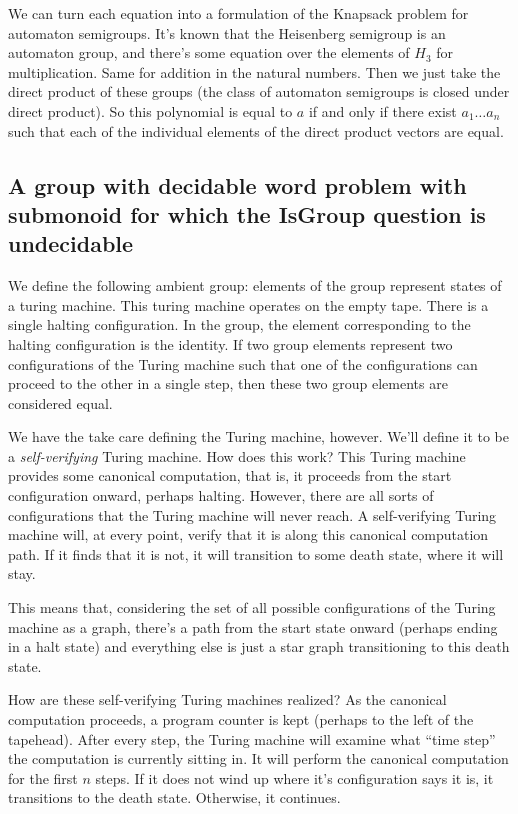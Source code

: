 \documentclass[10pt]{article}
\newcommand{\defn}[1]{\textit{#1}}
\begin{document}
We can turn each equation into a formulation of the Knapsack problem
for automaton semigroups. It's known that the Heisenberg semigroup is
an automaton group, and there's some equation over the elements of
$H_3$ for multiplication. Same for addition in the natural
numbers. Then we just take the direct product of these groups (the
class of automaton semigroups is closed under direct product). So this
polynomial is equal to $a$ if and only if there exist $a_1 \ldots a_n$
such that each of the individual elements of the direct product
vectors are equal.

\subsection{A group with decidable word problem with submonoid for
  which the IsGroup question is undecidable}

We define the following ambient group: elements of the group represent
states of a turing machine. This turing machine operates on the empty
tape. There is a single halting configuration. In the group, the
element corresponding to the halting configuration is the identity. If
two group elements represent two configurations of the Turing machine
such that one of the configurations can proceed to the other in a
single step, then these two group elements are considered equal.

We have the take care defining the Turing machine, however. We'll
define it to be a \defn{self-verifying} Turing machine. How does this
work? This Turing machine provides some canonical computation, that
is, it proceeds from the start configuration onward, perhaps
halting. However, there are all sorts of configurations that the
Turing machine will never reach. A self-verifying Turing machine will,
at every point, verify that it is along this canonical computation
path. If it finds that it is not, it will transition to some death
state, where it will stay.

This means that, considering the set of all possible configurations of
the Turing machine as a graph, there's a path from the start state
onward (perhaps ending in a halt state) and everything else is just a
star graph transitioning to this death state.

How are these self-verifying Turing machines realized? As the
canonical computation proceeds, a program counter is kept (perhaps to
the left of the tapehead). After every step, the Turing machine will
examine what ``time step'' the computation is currently sitting in. It
will perform the canonical computation for the first $n$ steps. If it
does not wind up where it's configuration says it is, it transitions
to the death state. Otherwise, it continues.
\end{document}
